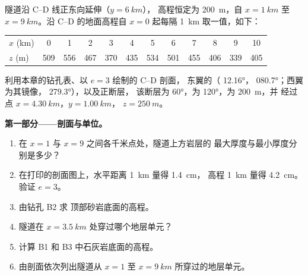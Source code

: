 \begin{problem}
\label{pb:b1:cross-sections:1}
隧道沿 C--D 线正东向延伸（$y = \qty{6}{km}$），
高程恒定为 \qty{200}{m}，自 $x = \qty{1}{km}$ 至 $x =
\qty{9}{km}$。沿 C--D 的地面高程自 $x = 0$ 起每隔 \qty{1}{km}
取一值，如下：
\begin{center}
\small
\begin{tabular}{lccccccccccc}
\hline
$x$ (km) & 0 & 1 & 2 & 3 & 4 & 5 & 6 & 7 & 8 & 9 & 10 \\
$z$ (m) & 509 & 556 & 467 & 370 & 435 & 534 & 501 & 455 & 406 & 339 & 405 \\
\hline
\end{tabular}
\end{center}
利用本章的钻孔表、以 $e = 3$ 绘制的 C--D 剖面，
东翼的（ \ang{12.16}， \ang{080.7}；西翼
为其镜像， \ang{279.3}），以及正断层，
该断层为 \ang{60}，为 \ang{120}，为 \qty{200}{m}，并
经过点 $x = \qty{4.30}{km}$，$y = \qty{1.00}{km}$，
$z = \qty{250}{m}$。

\medskip
\noindent\textbf{第一部分——剖面与单位。}
\begin{enumerate}
  \item 在 $x = 1$ 与 $x = 9$ 之间各千米点处，隧道上方岩层的
        最大厚度与最小厚度分别是多少？
  \item 在打印的剖面图上，水平距离 \qty{1}{km} 量得 \qty{1.4}{cm}，
        高程 \qty{1}{km} 量得 \qty{4.2}{cm}。
        验证 $e = 3$。
  \item 由钻孔 B2 求
        顶部砂岩底面的高程。
  \item 隧道在 $x = \qty{3.5}{km}$ 处穿过哪个地层单元？
  \item 计算 B1 和 B3 中石灰岩底面的高程。
  \item 由剖面依次列出隧道从 $x = 1$ 至
        $x = \qty{9}{km}$ 所穿过的地层单元。
\end{enumerate}


\end{problem}
